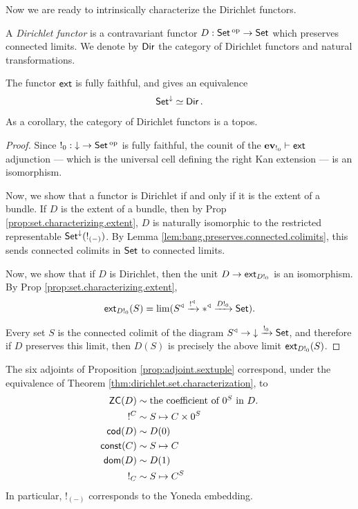 Now we are ready to intrinsically characterize the Dirichlet functors.
\begin{defn}
A \emph{Dirichlet functor} is a contravariant functor $D : \operatorname{\mathsf{{Set}}}\operatorname{^\textnormal{op}} \to \operatorname{\mathsf{{Set}}}$
which preserves connected limits. We denote by $\operatorname{\mathsf{{Dir}}}$ the category of Dirichlet functors and natural transformations.
\end{defn}


\begin{thm}\label{thm:dirichlet.set.characterization}
  The functor $\operatorname{\mathsf{{ext}}}$ is fully faithful, and gives an equivalence
  $$\operatorname{\mathsf{{Set}}}^{\mathbin{\downarrow}} \simeq \operatorname{\mathsf{{Dir}}}.$$

  As a corollary, the category of Dirichlet functors is a topos.
\end{thm}
\begin{proof}
Since $!_0 : \mathbin{\downarrow} \to \operatorname{\mathsf{{Set}}}\operatorname{^\textnormal{op}}$ is fully faithful, the counit of the
$\operatorname{\textbf{ev}}_{!_0} \vdash \operatorname{\mathsf{{ext}}}$ adjunction --- which is the universal cell defining the
right Kan extension --- is an isomorphism. 
  
Now, we show that a functor is Dirichlet if and only if it is the extent of a bundle. If $D$ is
the extent of a bundle, then by Prop \ref{prop:set.characterizing.extent}, $D$ is naturally
isomorphic to the restricted representable $\operatorname{\mathsf{{Set}}}^{\mathbin{\downarrow}}(!_{(-)})$. By Lemma
\ref{lem:bang.preserves.connected.colimits}, this sends connected colimits in $\operatorname{\mathsf{{Set}}}$ to
connected limits.

Now, we show that if $D$ is Dirichlet, then the unit
$D \to \operatorname{\mathsf{{ext}}}_{D!_0}$ is an isomorphism. By Prop
\ref{prop:set.characterizing.extent}, 
  $$\operatorname{\mathsf{{ext}}}_{D!_0}(S) = \lim(S^{\triangleleft} \xrightarrow{!^{\triangleleft}} \ast^{\triangleleft}
  \xrightarrow{D!_0} \operatorname{\mathsf{{Set}}}).$$
  
Every set $S$ is the connected colimit of the diagram $S^{\triangleleft} \to
\mathbin{\downarrow} \xrightarrow{!_0} \operatorname{\mathsf{{Set}}}$, and therefore if $D$ preserves this limit, then
$D(S)$ is precisely the above limit $\operatorname{\mathsf{{ext}}}_{D!_0}(S)$.
\end{proof}

\begin{rmk}
The six adjoints of Proposition \ref{prop:adjoint.sextuple} correspond, under
the equivalence of Theorem \ref{thm:dirichlet.set.characterization}, to
\begin{align*}
  \mathsf{{ZC}}(D) &\sim \mbox{the coefficient of $0^S$ in $D$.}\\
  !^{C} &\sim S \mapsto C \times 0^S \\
  \operatorname{\mathsf{{cod}}}(D) &\sim D(0) \\
  \mathsf{{const}}(C) &\sim S \mapsto C \\
  \operatorname{\mathsf{{dom}}}(D) &\sim D(1) \\
  !_{C} &\sim S \mapsto C^S \\
\end{align*}
In particular, $!_{(-)}$ corresponds to the Yoneda embedding.
\end{rmk}

